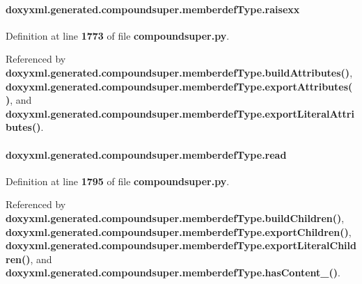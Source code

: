 \paragraph[{raisexx}]{\setlength{\rightskip}{0pt plus 5cm}doxyxml.\+generated.\+compoundsuper.\+memberdef\+Type.\+raisexx}\label{classdoxyxml_1_1generated_1_1compoundsuper_1_1memberdefType_aea9f4e2aa13d526c2df9357bf882c253}


Definition at line {\bf 1773} of file {\bf compoundsuper.\+py}.



Referenced by {\bf doxyxml.\+generated.\+compoundsuper.\+memberdef\+Type.\+build\+Attributes()}, {\bf doxyxml.\+generated.\+compoundsuper.\+memberdef\+Type.\+export\+Attributes()}, and {\bf doxyxml.\+generated.\+compoundsuper.\+memberdef\+Type.\+export\+Literal\+Attributes()}.

\paragraph[{read}]{\setlength{\rightskip}{0pt plus 5cm}doxyxml.\+generated.\+compoundsuper.\+memberdef\+Type.\+read}\label{classdoxyxml_1_1generated_1_1compoundsuper_1_1memberdefType_a079182a59afbfde1cf4c22d09f34ec0e}


Definition at line {\bf 1795} of file {\bf compoundsuper.\+py}.



Referenced by {\bf doxyxml.\+generated.\+compoundsuper.\+memberdef\+Type.\+build\+Children()}, {\bf doxyxml.\+generated.\+compoundsuper.\+memberdef\+Type.\+export\+Children()}, {\bf doxyxml.\+generated.\+compoundsuper.\+memberdef\+Type.\+export\+Literal\+Children()}, and {\bf doxyxml.\+generated.\+compoundsuper.\+memberdef\+Type.\+has\+Content\+\_\+()}.

